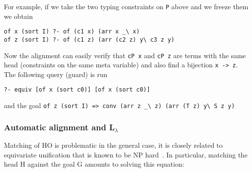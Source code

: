 \documentclass{easychair}
\begin{document}
For example, if we take the two typing constraints on \verb+P+ above
and we freeze them we obtain

\begin{verbatim}
of x (sort I) ?- of (c1 x) (arr x _\ x)
of z (sort I) ?- of (c1 z) (arr (c2 z) y\ c3 z y)
\end{verbatim}

Now the alignment can easily verify that \verb+cP x+ and \verb+cP z+
are terms with the same head (constraints on the same meta variable)
and also find a bijection \verb+x -> z+.  The following query (guard)
is run

\begin{verbatim}
?- equiv [of x (sort c0)] [of x (sort c0)]
\end{verbatim}

and the goal \verb+of z (sort I) => conv (arr z _\ z) (arr (T z) y\ S z y)+

\subsubsection{Automatic alignment and L$_\lambda$}


\label{sec:realchr}

Matching of HO is problematic in the general case, it is closely
related to equivariate unification that is known to be NP
hard~\cite{Cheney2004}.
In particular, matching the head H against the goal G
amounts to solving this equation:
\end{document}
